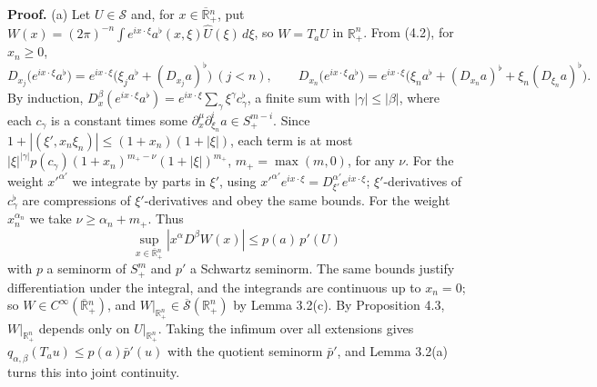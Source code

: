 \documentclass[
  11pt,
]{article}
\begin{document}
\textbf{Proof.} (a) Let \(U\in\mathcal S\) and, for
\(x\in\overline{\mathbb R}{}^n_+\), put
\(W(x)=(2\pi)^{-n}\int e^{ix\cdot\xi}a^\flat(x,\xi)\widehat U(\xi)\,d\xi\),
so \(W=T_aU\) in \(\mathbb R^n_+\). From (4.2), for \(x_n\geq0\), \[
D_{x_j}\big(e^{ix\cdot\xi}a^\flat\big)=e^{ix\cdot\xi}\big(\xi_ja^\flat+(D_{x_j}a)^\flat\big)\ (j<n),\qquad
D_{x_n}\big(e^{ix\cdot\xi}a^\flat\big)=e^{ix\cdot\xi}\big(\xi_na^\flat+(D_{x_n}a)^\flat+\xi_n(D_{\xi_n}a)^\flat\big).
\tag{5.3}
\] By induction,
\(D_x^\beta(e^{ix\cdot\xi}a^\flat)=e^{ix\cdot\xi}\sum_\gamma\xi^\gamma c_\gamma^\flat\),
a finite sum with \(|\gamma|\leq|\beta|\), where each \(c_\gamma\) is a
constant times some \(\partial_x^\mu\partial_{\xi_n}^ia\in S^{m-i}_+\).
Since \(1+|(\xi',x_n\xi_n)|\leq(1+x_n)(1+|\xi|)\), each term is at most
\(|\xi|^{|\gamma|}p(c_\gamma)(1+x_n)^{m_+-\nu}(1+|\xi|)^{m_+}\),
\(m_+=\max(m,0)\), for any \(\nu\). For the weight \(x'^{\alpha'}\) we
integrate by parts in \(\xi'\), using
\(x'^{\alpha'}e^{ix\cdot\xi}=D_{\xi'}^{\alpha'}e^{ix\cdot\xi}\);
\(\xi'\)-derivatives of \(c_\gamma^\flat\) are compressions of
\(\xi'\)-derivatives and obey the same bounds. For the weight
\(x_n^{\alpha_n}\) we take \(\nu\geq\alpha_n+m_+\). Thus \[
\sup_{x\in\overline{\mathbb R}{}^n_+}|x^\alpha D^\beta W(x)|\leq p(a)\,p'(U)
\] with \(p\) a seminorm of \(S^m_+\) and \(p'\) a Schwartz seminorm.
The same bounds justify differentiation under the integral, and the
integrands are continuous up to \(x_n=0\); so
\(W\in C^\infty(\overline{\mathbb R}{}^n_+)\), and
\(W|_{\mathbb R^n_+}\in\overline{\mathcal S}(\mathbb R^n_+)\) by Lemma
3.2(c). By Proposition 4.3, \(W|_{\mathbb R^n_+}\) depends only on
\(U|_{\mathbb R^n_+}\). Taking the infimum over all extensions gives
\(q_{\alpha,\beta}(T_au)\leq p(a)\bar p'(u)\) with the quotient seminorm
\(\bar p'\), and Lemma 3.2(a) turns this into joint continuity.
\end{document}
